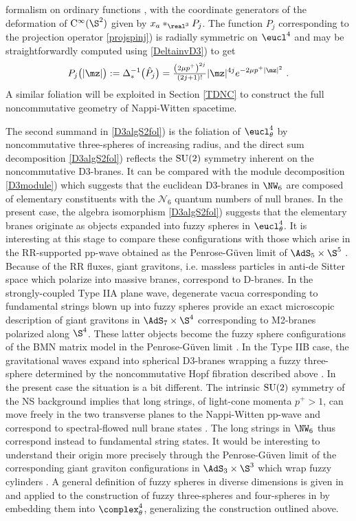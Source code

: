 formalism on ordinary functions \cite{HLS-J1}, with the coordinate
generators of the deformation of ${\rm C}^\infty(\S^2)$ given by
$x_a*_{\real^3}P_j$. The function $P_j$ corresponding to the projection
operator
\eqref{projspinj}) is radially symmetric on $\eucl^4$ and may
be straightforwardly computed using \eqref{DeltainvD3}) to get
\begin{equation}
P_j\bigl(|\mz|\bigr):=\Delta_*^{-1}\bigl(\hat P_j\bigr)
=\mbox{$\frac{\left(2\mu p^+\right)^{2j}}{(2j+1)!}$} 
|\mz|^{4j}  e^{-2\mu p^+ |\mz|^2} \ .
\label{projspinjfn}\end{equation}
A similar foliation will be exploited in Section \ref{TDNC} to construct the
full noncommutative geometry of Nappi-Witten spacetime.

The second summand in \eqref{D3algS2fol}) is the foliation of $\eucl_\theta^4$
by noncommutative three-spheres of increasing radius, and the direct sum
decomposition \eqref{D3algS2fol}) reflects the ${\rm SU}(2)$ symmetry inherent
on the noncommutative D3-branes. It can be compared with the module
decomposition \eqref{D3module}) which suggests that the euclidean D3-branes in
$\NW_6$ are composed of elementary constituents with the
$\mathcal{N}_6$ quantum numbers of null branes. In the present case,
the algebra isomorphism \eqref{D3algS2fol}) suggests that the
elementary branes originate as objects expanded into fuzzy spheres in
$\eucl_\theta^4$. It is interesting at this stage to compare these
configurations with those which arise in the RR-supported pp-wave obtained as
the Penrose-G\"uven limit of $\AdS_5\times\S^5$ \cite{BFHP1}. Because
of the RR fluxes, giant gravitons, i.e. massless particles in
anti-de Sitter space which polarize into massive
branes, correspond to D-branes. In the strongly-coupled Type IIA plane wave,
degenerate vacua corresponding to fundamental strings blown up into fuzzy
spheres provide an exact microscopic description of giant gravitons in
$\AdS_7\times\S^4$ corresponding to M2-branes polarized along $\S^4$. These
latter objects become the fuzzy sphere configurations of the BMN matrix model
in the Penrose-G\"uven limit \cite{BMN1}. In the Type IIB case, the
gravitational waves expand into spherical D3-branes wrapping a fuzzy
three-sphere determined by the noncommutative Hopf fibration described
above \cite{JLR-G1,S-J1}. In the present case the
situation is a bit different. The intrinsic ${\rm SU}(2)$ symmetry of the NS
background implies that long strings, of light-cone momenta $p^+>1$, can move
freely in the two transverse planes to the Nappi-Witten pp-wave and correspond
to spectral-flowed null brane states \cite{BAKZ1}. The long strings in
$\NW_6$ thus correspond instead to fundamental string states. It would
be interesting to understand their origin more precisely through the
Penrose-G\"uven limit of the corresponding giant graviton
configurations in $\AdS_3\times\S^3$ which wrap fuzzy
cylinders \cite{JLR-G2}. A general definition of fuzzy spheres in
diverse dimensions is given in \cite{S-J1} and applied to the
construction of fuzzy three-spheres and four-spheres in \cite{S-JT1}
by embedding them into $\complex^4_\theta$, generalizing the
construction outlined above.

